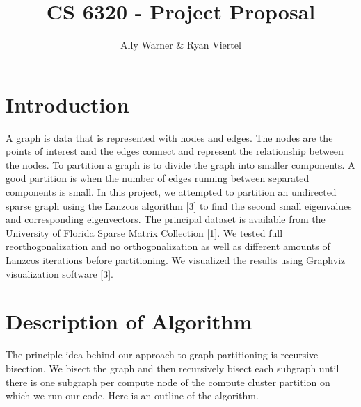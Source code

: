 \documentclass[11pt, oneside]{article}   	%
\title{CS 6320 - Project Proposal}
\author{Ally Warner \& Ryan Viertel}
\begin{document}
\maketitle

\section{Introduction}
A graph is data that is represented with nodes and edges. The nodes are the points of interest and the edges connect and represent the relationship between the nodes. To partition a graph is to divide the graph into smaller components. A good partition is when the number of edges running between separated components is small. In this project, we attempted to partition an undirected sparse graph using the Lanzcos algorithm [3] to find the second small eigenvalues and corresponding eigenvectors.  The principal dataset is available from the University of Florida Sparse Matrix Collection [1]. We tested full reorthogonalization and no orthogonalization as well as different amounts of Lanzcos iterations before partitioning. We visualized the results using Graphviz visualization software [3].

\section{Description of Algorithm}
The principle idea behind our approach to graph partitioning is recursive bisection. We bisect the graph and then recursively bisect each subgraph until there is one subgraph per compute node of the compute cluster partition on which we run our code. Here is an outline of the algorithm.
\end{document}
